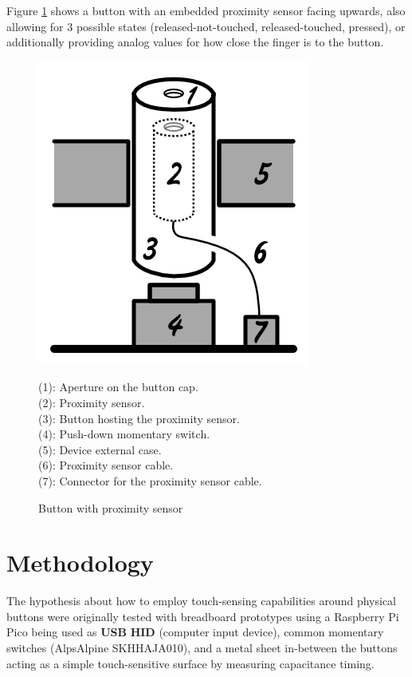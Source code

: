 \documentclass[10pt, twocolumn, a4paper]{article}
\begin{document}
    Figure \ref{fig_B3} shows a button with an embedded proximity sensor facing upwards, also allowing for 3 possible states (released-not-touched, released-touched, pressed), or additionally providing analog values for how close the finger is to the button.
    \begin{figure}[H]
        \begin{center}
            \includegraphics[width=0.4\linewidth]{figure_B3.png}
            \caption{Button with proximity sensor\\}
            \label{fig_B3}
            \small
                \vspace{2mm}
                (1): Aperture on the button cap.\\
                (2): Proximity sensor.\\
                (3): Button hosting the proximity sensor.\\
                (4): Push-down momentary switch.\\
                (5): Device external case.\\
                (6): Proximity sensor cable.\\
                (7): Connector for the proximity sensor cable.
        \end{center}
    \end{figure}

\section{Methodology}
    The hypothesis about how to employ touch-sensing capabilities around physical buttons were originally tested with breadboard prototypes using a Raspberry Pi Pico being used as \textbf{USB} \textbf{HID} (computer input device), common momentary switches (AlpsAlpine SKHHAJA010), and a metal sheet in-between the buttons acting as a simple touch-sensitive surface by measuring capacitance timing.
\end{document}
